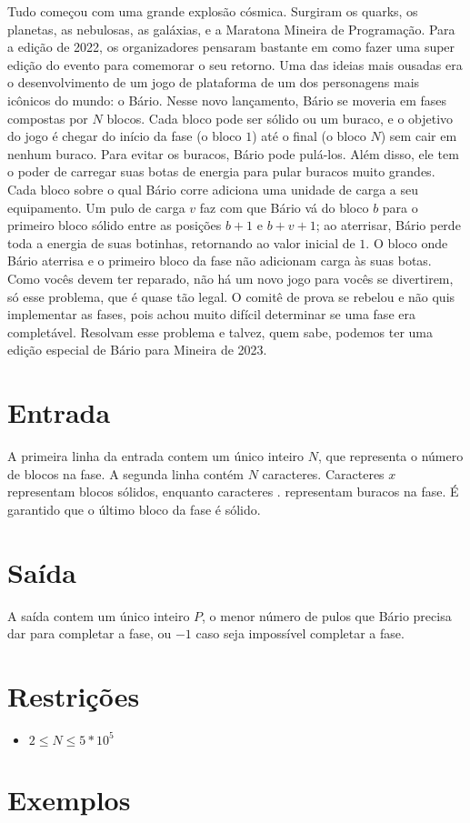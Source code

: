 Tudo começou com uma grande explosão cósmica. Surgiram os quarks, os planetas, as nebulosas, as galáxias, e a Maratona Mineira de Programação.
Para a edição de 2022, os organizadores pensaram bastante em como fazer uma super edição do evento para comemorar o seu retorno. Uma das ideias mais
ousadas era o desenvolvimento de um jogo de plataforma de um dos personagens mais icônicos do mundo: o Bário.
Nesse novo lançamento, Bário se moveria em fases compostas por $N$ blocos.
Cada bloco pode ser sólido ou um buraco, e o objetivo do jogo é chegar do início da fase (o bloco $1$) até o final (o bloco $N$) sem cair em nenhum buraco.
Para evitar os buracos, Bário pode pulá-los.
Além disso, ele tem o poder de carregar suas botas de energia para pular buracos muito grandes.
Cada bloco sobre o qual Bário corre adiciona uma unidade de carga a seu equipamento.
Um pulo de carga $v$ faz com que Bário vá do bloco $b$ para o primeiro bloco sólido entre as posições $b+1$ e $b+v+1$;
ao aterrisar, Bário perde toda a energia de suas botinhas, retornando ao valor inicial de $1$.
O bloco onde Bário aterrisa e o primeiro bloco da fase não adicionam carga às suas botas.
Como vocês devem ter reparado, não há um novo jogo para vocês se divertirem, só esse problema, que é quase tão legal.
O comitê de prova se rebelou e não quis implementar as fases, pois achou muito difícil determinar se uma fase era completável.
Resolvam esse problema e talvez, quem sabe, podemos ter uma edição especial de Bário para Mineira de 2023.



\section*{Entrada}

A primeira linha da entrada contem um único inteiro $N$, que representa o número de blocos na fase.
A segunda linha contém $N$ caracteres. Caracteres $x$ representam blocos sólidos, enquanto caracteres $.$ representam buracos na fase. É garantido que o último bloco da fase é sólido.

\section*{Saída}

A saída contem um único inteiro $P$, o menor número de pulos que Bário precisa dar para completar a fase, ou $-1$ caso seja impossível completar a fase.

\section*{Restrições}

\begin{itemize}
\item $2 \leq N \leq 5 * 10^5$
\end{itemize}


\section*{Exemplos}

\exemplo
